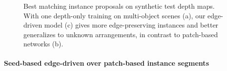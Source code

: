 \documentclass[runningheads,a4paper]{llncs}
\newlength\mywidth
\begin{document}
\begin{figure}[h!]
\centering
\setlength{\mywidth}{.23\linewidth}

\qquad
{}\hspace{0.05cm}
\hspace{0.05cm}

\qquad
{}\hspace{0.05cm}
\hspace{0.05cm}

\addtocounter{subfigure}{-8}

\qquad
{}\hspace{0.05cm}
\hspace{0.05cm}

\caption{Best matching instance proposals on synthetic test depth maps. With one depth-only training on multi-object scenes (a), our edge-driven model (c) gives more edge-preserving instances and better generalizes to unknown arrangements, in contrast to patch-based networks (b).}
\label{fig:results}
\end{figure}

\paragraph{Seed-based edge-driven over patch-based instance segments}
\end{document}
